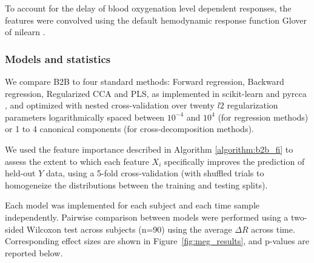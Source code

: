 To account for the delay of blood oxygenation level dependent responses, the
features were convolved using the default hemodynamic response function Glover
of nilearn \citep{nilearn}.

\subsubsection{Models and statistics}

We compare B2B to four standard methods: Forward regression, Backward
regression, Regularized CCA and PLS, as implemented in scikit-learn
\citep{sklearn} and pyrcca \citep{bilenko2016pyrcca}, and optimized with nested cross-validation over twenty $l2$
regularization parameters logarithmically spaced between $10^{-4}$ and $10^4$
(for regression methods) or 1 to 4 canonical components (for cross-decomposition
methods).

We used the feature importance described in Algorithm \ref{algorithm:b2b_fi} to assess the extent to which each feature $X_i$ specifically improves the prediction of held-out $Y$ data, using a 5-fold cross-validation (with shuffled trials to homogeneize the distributions between the training and testing splits).

Each model was implemented for each subject and each time sample independently. Pairwise comparison between models were performed using a two-sided Wilcoxon test across subjects (n=90) using the average $\Delta R$ across time. Corresponding effect sizes are shown in Figure~\ref{fig:meg_results}, and p-values are reported below.


